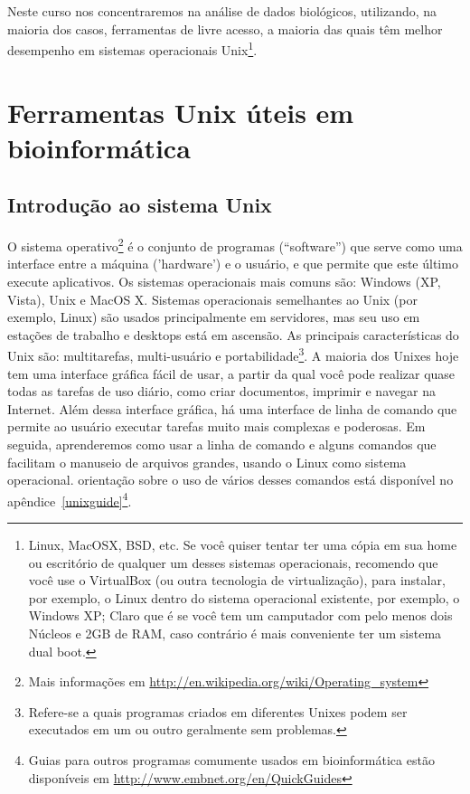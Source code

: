 \documentclass[letter,11pt]{book}
\begin{document}
Neste curso nos concentraremos na análise de dados biológicos, utilizando, na maioria dos casos, ferramentas de livre acesso, a maioria das quais têm melhor desempenho em sistemas operacionais Unix\footnote{Linux, MacOSX, BSD, etc. Se você quiser tentar ter uma cópia em sua home ou escritório de qualquer um desses sistemas operacionais, recomendo que você use o VirtualBox (ou outra tecnologia de virtualização), para instalar, por exemplo, o Linux dentro do sistema operacional existente, por exemplo, o Windows XP; Claro que é se você tem um camputador com pelo menos dois Núcleos e 2GB de RAM, caso contrário é mais conveniente ter um sistema dual boot.}.

\chapter{Ferramentas Unix úteis em bioinformática}
\section{Introdução ao sistema Unix}

O sistema operativo\footnote{Mais informações em \url{http://en.wikipedia.org/wiki/Operating_system}} é o conjunto de programas (``software'') que serve como uma interface entre a máquina ('hardware') e o usuário, e que permite que este último execute aplicativos. Os sistemas operacionais mais comuns são: Windows (XP, Vista), Unix e MacOS X. Sistemas operacionais semelhantes ao Unix (por exemplo, Linux) são usados principalmente em servidores, mas seu uso em estações de trabalho e desktops está em ascensão.  As principais características do Unix são: multitarefas, multi-usuário e portabilidade\footnote{Refere-se a quais programas criados em diferentes Unixes podem ser executados em um ou outro geralmente sem problemas.}. A maioria dos Unixes hoje tem uma interface gráfica fácil de usar, a partir da qual você pode realizar quase todas as tarefas de uso diário, como criar documentos, imprimir e navegar na Internet. Além dessa interface gráfica, há uma interface de linha de comando que permite ao usuário executar tarefas muito mais complexas e poderosas. Em seguida, aprenderemos como usar a linha de comando e alguns comandos que facilitam o manuseio de arquivos grandes, usando o Linux como sistema operacional. orientação sobre o uso de vários desses comandos está disponível no apêndice~\ref{unixguide}\footnote{Guias para outros programas comumente usados em bioinformática estão disponíveis em \url{http://www.embnet.org/en/QuickGuides}}.
\end{document}
